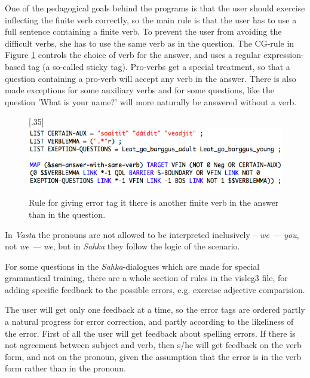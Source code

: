 \documentclass[11pt]{article}
\begin{document}
One of the pedagogical goals behind the programs is that the user should exercise inflecting the finite verb correctly, so the main rule is that the user has to use a full sentence containing a finite verb. To prevent the user from avoiding the difficult verbs, she has to use the same verb as in the question. The CG-rule in Figure \ref{sameverb} controls the choice of verb for the answer, and uses a regular expression-based tag (a so-called sticky tag). Pro-verbs get a special treatment, so that a question containing a pro-verb will accept any verb in the answer. There is also made exceptions for some auxiliary verbs and for some questions, like the question 'What is your name?' will more naturally be answered without a verb. \\


\begin{figure}[htbp]
\begin{center}
\scalebox{.35}[.35]{\includegraphics{presentation/img/verblemma.png}}\\
\caption{Rule for giving error tag it there is another finite verb in the answer than in the question.}
\label{sameverb}
\end{center}
\end{figure}


In \textit{Vasta} the pronouns are not allowed to be interpreted inclusively -- \textit{we — you}, not \textit{we — we}, but in \textit{Sahka} they follow the logic of the scenario.

For some questions in the \textit{Sahka}-dialogues which are made for special grammatical training, there are a whole section of rules in the vislcg3 file, for adding specific feedback to the possible errors, e.g. exercise adjective comparision.

The user will get only one feedback at a time, so the error tags are ordered partly a natural progress for error correction, and partly according to the likeliness of the error. First of all the user will get feedback about spelling errors. If there is not agreement between subject and verb, then s/he will get feedback on the verb form, and not on the pronoun, given the assumption that the error is in the verb form rather than in the pronoun.
\end{document}
